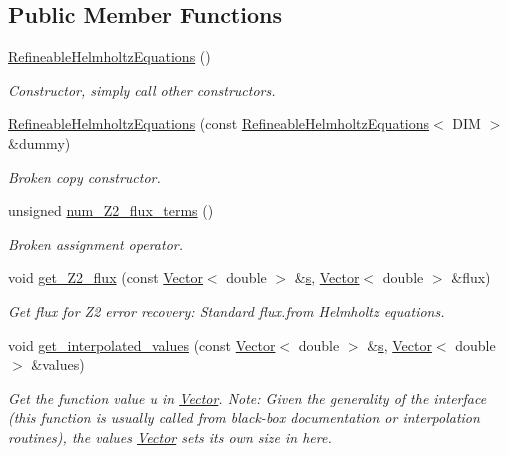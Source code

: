 \subsection*{Public Member Functions}
\begin{DoxyCompactItemize}
\item 
\hyperlink{classoomph_1_1RefineableHelmholtzEquations_a7b33736187e9f98fcdae1c8187cd819b}{Refineable\+Helmholtz\+Equations} ()
\begin{DoxyCompactList}\small\item\em Constructor, simply call other constructors. \end{DoxyCompactList}\item 
\hyperlink{classoomph_1_1RefineableHelmholtzEquations_a307232bc956de2f2753cc016774d6b69}{Refineable\+Helmholtz\+Equations} (const \hyperlink{classoomph_1_1RefineableHelmholtzEquations}{Refineable\+Helmholtz\+Equations}$<$ D\+IM $>$ \&dummy)
\begin{DoxyCompactList}\small\item\em Broken copy constructor. \end{DoxyCompactList}\item 
unsigned \hyperlink{classoomph_1_1RefineableHelmholtzEquations_a715bc9ef2960fd9246557e985c1eba7d}{num\+\_\+\+Z2\+\_\+flux\+\_\+terms} ()
\begin{DoxyCompactList}\small\item\em Broken assignment operator. \end{DoxyCompactList}\item 
void \hyperlink{classoomph_1_1RefineableHelmholtzEquations_ae3981b8ad03d951b0d661d223ad8e560}{get\+\_\+\+Z2\+\_\+flux} (const \hyperlink{classoomph_1_1Vector}{Vector}$<$ double $>$ \&\hyperlink{cfortran_8h_ab7123126e4885ef647dd9c6e3807a21c}{s}, \hyperlink{classoomph_1_1Vector}{Vector}$<$ double $>$ \&flux)
\begin{DoxyCompactList}\small\item\em Get \textquotesingle{}flux\textquotesingle{} for Z2 error recovery\+: Standard flux.\+from Helmholtz equations. \end{DoxyCompactList}\item 
void \hyperlink{classoomph_1_1RefineableHelmholtzEquations_a6d3102c899dac5c4e18fee3564323509}{get\+\_\+interpolated\+\_\+values} (const \hyperlink{classoomph_1_1Vector}{Vector}$<$ double $>$ \&\hyperlink{cfortran_8h_ab7123126e4885ef647dd9c6e3807a21c}{s}, \hyperlink{classoomph_1_1Vector}{Vector}$<$ double $>$ \&values)
\begin{DoxyCompactList}\small\item\em Get the function value u in \hyperlink{classoomph_1_1Vector}{Vector}. Note\+: Given the generality of the interface (this function is usually called from black-\/box documentation or interpolation routines), the values \hyperlink{classoomph_1_1Vector}{Vector} sets its own size in here. \end{DoxyCompactList}\item 

\end{DoxyCompactItemize}

